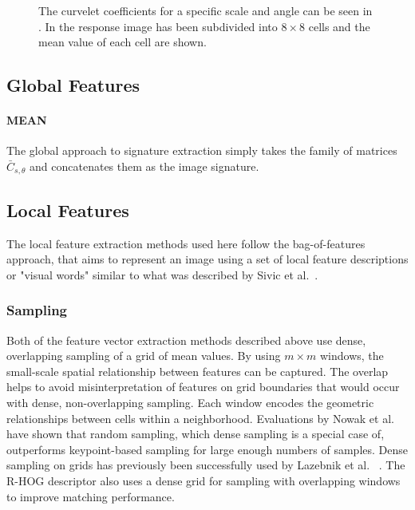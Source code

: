 \begin{figure}[h]
    \centering
    \quad
    \caption[Curvelet coefficients and means]{
        The curvelet coefficients for a specific scale and angle can be seen in
        . In
         the response image has
        been subdivided into $8 \times 8$ cells and the mean value of each cell
        are shown.
    }
    \label{fig:signature_examples}
\end{figure}

\subsection{Global Features}\label{sec:solution_signature_extraction_global}

\paragraph{MEAN}

The global approach to signature extraction simply takes the family of matrices
$\bar{C}_{s, \theta}$ and concatenates them as the image signature.

\subsection{Local Features}\label{sec:solution_signature_extraction_local}

The local feature extraction methods used here follow the bag-of-features
approach, that aims to represent an image using a set of local feature
descriptions or "visual words" similar to what was described by Sivic et al.\ 
\autocite{sivic_video_2003}. 

\subsubsection{Sampling}

Both of the feature vector extraction methods described above use dense,
overlapping sampling of a grid of mean values. By using $m \times m$ windows,
the small-scale spatial relationship between features can be captured. The
overlap helps to avoid misinterpretation of features on grid boundaries that
would occur with dense, non-overlapping sampling. Each window encodes the
geometric relationships between cells within a neighborhood. 
Evaluations by Nowak et al.\ \autocite{nowak_sampling_2006} have shown that
random sampling, which dense sampling is a special case of, outperforms
keypoint-based sampling for large enough numbers of samples. Dense sampling on
grids has previously been successfully used by Lazebnik et al.\
\autocite{lazebnik_beyond_2006} \autocite{lazebnik_spatial_2009}. The R-HOG
descriptor \autocite{dalal_histograms_2005} also uses a dense grid for sampling
with overlapping windows to improve matching performance.

